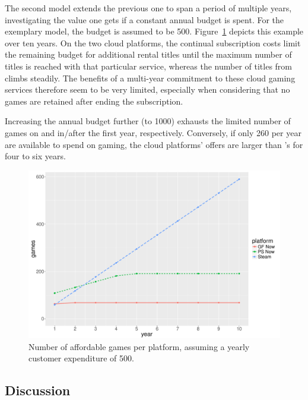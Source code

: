The second model extends the previous one to span a period of multiple years, investigating the value one gets if a constant annual budget is spent. For the exemplary model, the budget is assumed to be \SI{500}{\EUR}.
Figure~\ref{fig:games-over-years} depicts this example over ten years. On the two cloud platforms, the continual subscription costs limit the remaining budget for additional rental titles until the maximum number of titles is reached with that particular service, whereas the number of titles from \steam climbs steadily. The benefits of a multi-year commitment to these cloud gaming services therefore seem to be very limited, especially when considering that no games are retained after ending the subscription.

Increasing the annual budget further (to \SI{1000}{\EUR}) exhausts the limited number of games on \psnow and \gfnow in/after the first year, respectively. Conversely, if only \SI{260}{\EUR} per year are available to spend on gaming, the cloud platforms' offers are larger than \steam's for four to six years.

\begin{figure}[!t]
	\centering
	\includegraphics[width=1.0\columnwidth]{images/games-over-year.pdf}
	\caption{Number of affordable games per platform, assuming a yearly customer expenditure of \SI{500}{\EUR}.}
\label{fig:games-over-years}
\end{figure}



\subsection{Discussion}

